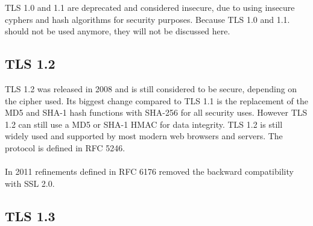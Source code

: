 TLS 1.0 and 1.1 are deprecated and considered insecure, due to using insecure cyphers and hash algorithms for security purposes. Because TLS 1.0 and 1.1. should not be used anymore, they will not be discussed here.

\subsection{TLS 1.2}

TLS 1.2 was released in 2008 and is still considered to be secure, depending on the cipher used. Its biggest change compared to TLS 1.1 is the replacement of the MD5 and SHA-1 hash functions with SHA-256 for all security uses. However TLS 1.2 can still use a MD5 or SHA-1 HMAC for data integrity. TLS 1.2 is still widely used and supported by most modern web browsers and servers. The protocol is defined in RFC 5246.
\\\\
In 2011 refinements defined in RFC 6176 removed the backward compatibility with SSL 2.0.

\subsection{TLS 1.3}

